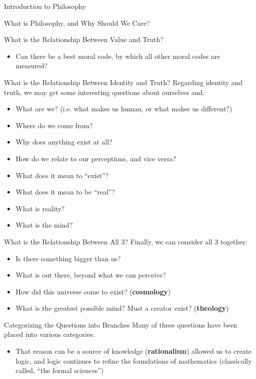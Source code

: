 \begin{chapter}{Introduction to Philosophy}
\begin{section}{What is Philosophy, and Why Should We Care?}
\begin{subsection}{What is the Relationship Between Value and Truth?}
\begin{itemize}
                \item Can there be a best moral code, by which all other moral codes are measured?
            \end{itemize}
        \end{subsection}
        \begin{subsection}{What is the Relationship Between Identity and Truth?}
            Regarding identity and truth, we may get some interesting questions about ourselves and:
            \begin{itemize}
                \item What are we? (i.e. what makes us human, or what makes us different?)
                \item Where do we come from?
                \item Why does anything exist at all?
                \item How do we relate to our perceptions, and vice versa?
                \item What does it mean to “exist”?
                \item What does it mean to be “real”?
                \item What is reality?
                \item What is the mind?
            \end{itemize}
        \end{subsection}
        \begin{subsection}{What is the Relationship Between All 3?}
            Finally, we can consider all 3 together:
            \begin{itemize}
                \item Is there something bigger than us?
                \item What is out there, beyond what we can perceive?
                \item How did this universe come to exist? (\textbf{cosmology})
                \item What is the greatest possible mind? Must a creator exist? (\textbf{theology})
            \end{itemize}
        \end{subsection}
            
        \begin{subsection}{Categorizing the Questions into Branches}
            Many of these questions have been placed into various categories:
            \begin{itemize}
                \item That reason can be a source of knowledge (\textbf{rationalism}) allowed us to create logic, and logic continues to refine the foundations of mathematics (classically called, “the formal sciences”)
                    

\end{itemize}
\end{subsection}
\end{section}
\end{chapter}
